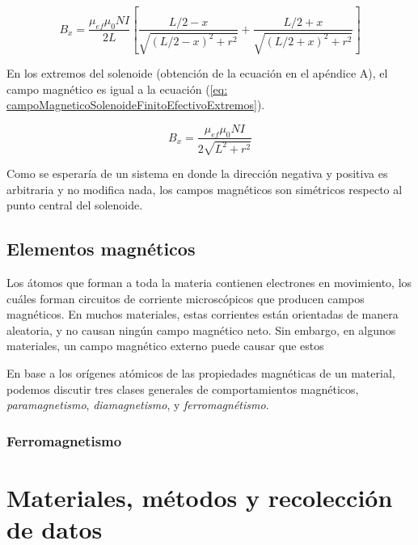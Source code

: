 \documentclass[a4paper,12pt]{article}
\begin{document}
        \begin{equation}
            \label{eq: campoMagneticoSolenoideFinitoEfectivo}
            B_x = \frac{\mu_{ef}\mu_0 N I}{2L} \left[ \frac{L/2 - x}{\sqrt{(L/2 - x)^2 + r^2}} + \frac{L/2 + x}{\sqrt{(L/2 + x)^2 + r^2}} \right]
        \end{equation}

        En los extremos del solenoide (obtención de la ecuación en el apéndice A), el campo magnético es igual a la ecuación (\ref{eq: campoMagneticoSolenoideFinitoEfectivoExtremos}).

        \begin{equation}
            \label{eq: campoMagneticoSolenoideFinitoEfectivoExtremos}
            B_x = \frac{\mu_{ef}\mu_0 N I}{2\sqrt{L^2 + r^2}}
        \end{equation}

        Como se esperaría de un sistema en donde la dirección negativa y positiva es arbitraria y no modifica nada, los campos magnéticos son simétricos respecto al punto central del solenoide.

    \subsection*{Elementos magnéticos}

        Los átomos que forman a toda la materia contienen electrones en movimiento, los cuáles forman circuitos de corriente microscópicos que producen campos magnéticos. En muchos materiales, estas corrientes están orientadas de manera aleatoria, y no causan ningún campo magnético neto. Sin embargo, en algunos materiales, un campo magnético externo puede causar que estos

        En base a los orígenes atómicos de las propiedades magnéticas de un material, podemos discutir tres clases generales de comportamientos magnéticos, \emph{paramagnetismo}, \emph{diamagnetismo}, y \emph{ferromagnétismo}. 

    \subsubsection*{Ferromagnetismo}

        

\section*{Materiales, métodos y recolección de datos}
\end{document}
